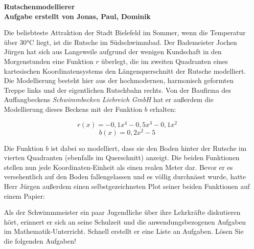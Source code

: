 \documentclass[ngerman, a4paper, 11pt]{article}
\begin{document}
\begin{center}
    \huge \bf{Rutschenmodellierer}\\
    \footnotesize{Aufgabe erstellt von Jonas, Paul, Dominik}
\end{center}

\vspace{1.5cm}

Die beliebteste Attraktion der Stadt Bielefeld im Sommer,
wenn die Temperatur über 30°C liegt,
ist die Rutsche im Südschwimmbad.
Der Bademeister Jochen Jürgen hat sich aus Langeweile
aufgrund der wenigen Kundschaft in den Morgenstunden eine Funktion $r$ überlegt,
die im zweiten Quadranten eines kartesischen Koordinatensystems den Längenquerschnitt der Rutsche modelliert.
Die Modellierung besteht hier aus der hochmodernen, harmonisch geformten Treppe links
und der eigentlichen Rutschbahn rechts.
Von der Baufirma des Auffangbeckens \textit{Schwimmbecken Liebreich GmbH}
hat er außerdem die Modellierung dieses Beckens mit der Funktion $b$ erhalten:

$$r(x) = -0,1x^4 - 0,5x^3 - 0,1x^2$$
$$b(x) = 0,2x^2 - 5$$

Die Funktion $b$ ist dabei so modelliert, dass sie den Boden hinter der Rutsche im vierten Quadranten (ebenfalls im Querschnitt) anzeigt.
Die beiden Funktionen stellen nun jede Koordinaten-Einheit als einen realen Meter dar.
Bevor er es versehentlich auf den Boden fallengelassen und es völlig durchnässt wurde,
hatte Herr Jürgen außerdem einen selbstgezeichneten Plot seiner beiden Funktionen auf einem Papier:

\begin{figure}[h]
    \centering
\end{figure}

Als der Schwimmmeister ein paar Jugendliche über ihre Lehrkräfte diskutieren hört,
erinnert er sich an seine Schulzeit und die anwendungsbezogenen Aufgaben im Mathematik-Unterricht.
Schnell erstellt er eine Liste an Aufgaben. Lösen Sie die folgenden Aufgaben!
\end{document}
